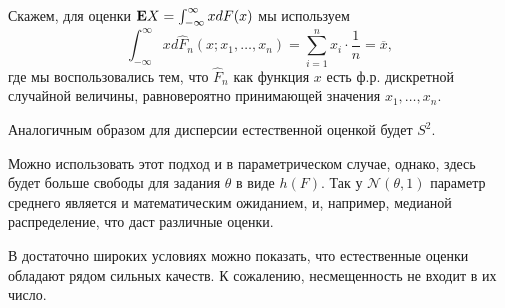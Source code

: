 \documentclass[10 pt,russian]{report}
\begin{document}
Скажем, для оценки ${\bf E}X = \int_{-\infty}^{\infty} x dF(x)$ мы используем
$$
\int_{-\infty}^{\infty} x d\widehat{F}_n(x;x_1,\dotsc,x_n) = \sum_{i=1}^{n} x_i \cdot \frac1n = \overline{x},
$$
где мы воспользовались тем, что $\widehat{F}_n$ как функция $x$ есть ф.р. дискретной случайной величины, равновероятно принимающей значения $x_1,\dotsc, x_n$. 

Аналогичным образом для дисперсии естественной оценкой будет $S^2$.

Можно использовать этот подход и в параметрическом случае, однако, здесь будет больше свободы для задания $\theta$ в виде $h(F)$. Так у $\mathcal{N}(\theta,1)$ параметр среднего является и математическим ожиданием, и, например, медианой распределение, что даст различные оценки.

В достаточно широких условиях можно показать, что естественные оценки обладают рядом сильных качеств. К сожалению, несмещенность не входит в их число.
\end{document}
